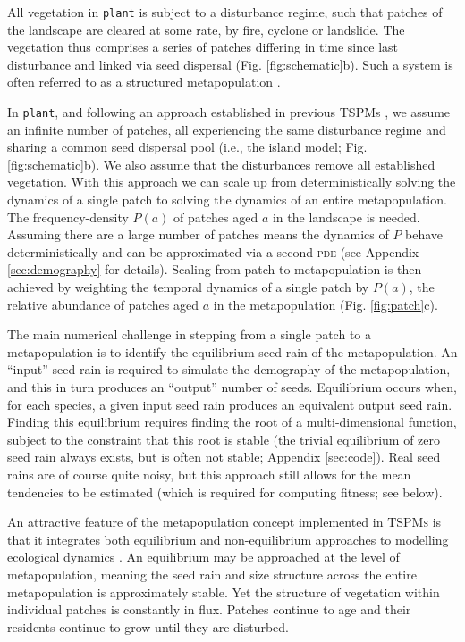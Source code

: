 \documentclass[a4paper,11pt]{article}
\newcommand{\plant}{\texttt{plant}}
\begin{document}
All vegetation in {\plant} is subject to a disturbance regime, such that patches
of the landscape are cleared at some rate, by fire, cyclone or
landslide.  The vegetation thus comprises a series of patches
differing in time since last disturbance and linked via seed dispersal
(Fig.  \ref{fig:schematic}b). Such a system is often referred to as a
structured metapopulation \citep{Gyllenberg-2001}.

In {\plant}, and following an approach established in previous TSPMs
\citep{Kohyama-1993, Moorcroft-2001, Falster-2011},
we assume an infinite number of patches, all experiencing
the same disturbance regime and sharing a common seed dispersal pool
(i.e., the island model; Fig. \ref{fig:schematic}b). We also assume
that the disturbances remove all established vegetation.  With this
approach we can scale up from deterministically solving the dynamics of
a single patch to solving the dynamics of an entire metapopulation.
The frequency-density \(P(a)\) of patches aged
\(a\) in the landscape is needed. Assuming there are a large number of
patches means the dynamics of \(P\) behave deterministically and can
be approximated via a second \textsc{pde} (see Appendix
\ref{sec:demography} for details). Scaling from patch to
metapopulation is then achieved by weighting the temporal dynamics of
a single patch by \(P(a)\), the relative abundance of patches aged
\(a\) in the metapopulation (Fig. \ref{fig:patch}c).

The main numerical challenge in stepping from a single patch to a
metapopulation is to identify the equilibrium seed rain of the
metapopulation. An ``input'' seed rain is required to simulate the
demography of the metapopulation, and this in turn produces an ``output''
number of seeds. Equilibrium occurs when, for each species,
a given input seed rain produces an equivalent output seed rain. Finding this equilibrium
requires finding the root of a multi-dimensional function, subject to
the constraint that this root is stable (the trivial equilibrium
of zero seed rain always exists, but is often not stable; Appendix
\ref{sec:code}).  Real seed rains are of course quite noisy,
but this approach still allows for the mean tendencies to be estimated (which is required for computing fitness; see below).

An attractive feature of the metapopulation concept implemented in \textsc{TSPMs}
is that it integrates both equilibrium and non-equilibrium approaches to
modelling ecological dynamics \citep{Kohyama-1993, Moorcroft-2001,
  Falster-2011}. An equilibrium may be approached at the level of
metapopulation, meaning the seed rain and size structure across the
entire metapopulation is approximately stable. Yet the structure of
vegetation within individual patches is constantly in flux. Patches
continue to age and their residents continue to grow until they are
disturbed.
\end{document}
